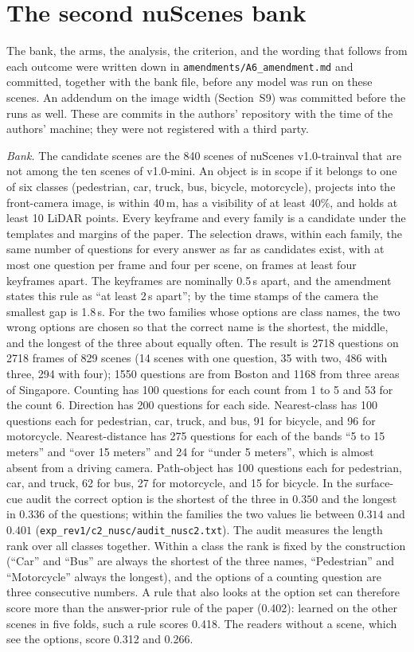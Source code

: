 \documentclass[10pt]{article}
\begin{document}
\section{The second nuScenes bank}
The bank, the arms, the analysis, the criterion, and the wording that follows from each outcome were written down in \texttt{amendments/A6\_amendment.md} and committed, together with the bank file, before any model was run on these scenes. An addendum on the image width (Section~S9) was committed before the runs as well. These are commits in the authors' repository with the time of the authors' machine; they were not registered with a third party.

\emph{Bank.} The candidate scenes are the 840 scenes of nuScenes v1.0-trainval that are not among the ten scenes of v1.0-mini. An object is in scope if it belongs to one of six classes (pedestrian, car, truck, bus, bicycle, motorcycle), projects into the front-camera image, is within 40\,m, has a visibility of at least 40\%, and holds at least 10 LiDAR points. Every keyframe and every family is a candidate under the templates and margins of the paper. The selection draws, within each family, the same number of questions for every answer as far as candidates exist, with at most one question per frame and four per scene, on frames at least four keyframes apart. The keyframes are nominally 0.5\,s apart, and the amendment states this rule as ``at least 2\,s apart''; by the time stamps of the camera the smallest gap is 1.8\,s. For the two families whose options are class names, the two wrong options are chosen so that the correct name is the shortest, the middle, and the longest of the three about equally often. The result is 2718 questions on 2718 frames of 829 scenes (14 scenes with one question, 35 with two, 486 with three, 294 with four); 1550 questions are from Boston and 1168 from three areas of Singapore. Counting has 100 questions for each count from 1 to 5 and 53 for the count 6. Direction has 200 questions for each side. Nearest-class has 100 questions each for pedestrian, car, truck, and bus, 91 for bicycle, and 96 for motorcycle. Nearest-distance has 275 questions for each of the bands ``5 to 15 meters'' and ``over 15 meters'' and 24 for ``under 5 meters'', which is almost absent from a driving camera. Path-object has 100 questions each for pedestrian, car, and truck, 62 for bus, 27 for motorcycle, and 15 for bicycle. In the surface-cue audit the correct option is the shortest of the three in $0.350$ and the longest in $0.336$ of the questions; within the families the two values lie between $0.314$ and $0.401$ (\texttt{exp\_rev1/c2\_nusc/audit\_nusc2.txt}). The audit measures the length rank over all classes together. Within a class the rank is fixed by the construction (``Car'' and ``Bus'' are always the shortest of the three names, ``Pedestrian'' and ``Motorcycle'' always the longest), and the options of a counting question are three consecutive numbers. A rule that also looks at the option set can therefore score more than the answer-prior rule of the paper (0.402): learned on the other scenes in five folds, such a rule scores 0.418. The readers without a scene, which see the options, score 0.312 and 0.266.
\end{document}
